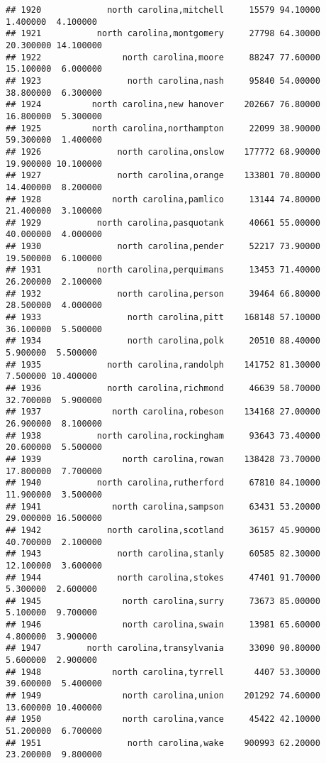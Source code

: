 \documentclass[
]{article}
\begin{document}
\begin{verbatim}
## 1920             north carolina,mitchell     15579 94.10000  1.400000  4.100000
## 1921           north carolina,montgomery     27798 64.30000 20.300000 14.100000
## 1922                north carolina,moore     88247 77.60000 15.100000  6.000000
## 1923                 north carolina,nash     95840 54.00000 38.800000  6.300000
## 1924          north carolina,new hanover    202667 76.80000 16.800000  5.300000
## 1925          north carolina,northampton     22099 38.90000 59.300000  1.400000
## 1926               north carolina,onslow    177772 68.90000 19.900000 10.100000
## 1927               north carolina,orange    133801 70.80000 14.400000  8.200000
## 1928              north carolina,pamlico     13144 74.80000 21.400000  3.100000
## 1929           north carolina,pasquotank     40661 55.00000 40.000000  4.000000
## 1930               north carolina,pender     52217 73.90000 19.500000  6.100000
## 1931           north carolina,perquimans     13453 71.40000 26.200000  2.100000
## 1932               north carolina,person     39464 66.80000 28.500000  4.000000
## 1933                 north carolina,pitt    168148 57.10000 36.100000  5.500000
## 1934                 north carolina,polk     20510 88.40000  5.900000  5.500000
## 1935             north carolina,randolph    141752 81.30000  7.500000 10.400000
## 1936             north carolina,richmond     46639 58.70000 32.700000  5.900000
## 1937              north carolina,robeson    134168 27.00000 26.900000  8.100000
## 1938           north carolina,rockingham     93643 73.40000 20.600000  5.500000
## 1939                north carolina,rowan    138428 73.70000 17.800000  7.700000
## 1940           north carolina,rutherford     67810 84.10000 11.900000  3.500000
## 1941              north carolina,sampson     63431 53.20000 29.000000 16.500000
## 1942             north carolina,scotland     36157 45.90000 40.700000  2.100000
## 1943               north carolina,stanly     60585 82.30000 12.100000  3.600000
## 1944               north carolina,stokes     47401 91.70000  5.300000  2.600000
## 1945                north carolina,surry     73673 85.00000  5.100000  9.700000
## 1946                north carolina,swain     13981 65.60000  4.800000  3.900000
## 1947         north carolina,transylvania     33090 90.80000  5.600000  2.900000
## 1948              north carolina,tyrrell      4407 53.30000 39.600000  5.400000
## 1949                north carolina,union    201292 74.60000 13.600000 10.400000
## 1950                north carolina,vance     45422 42.10000 51.200000  6.700000
## 1951                 north carolina,wake    900993 62.20000 23.200000  9.800000

\end{verbatim}
\end{document}
